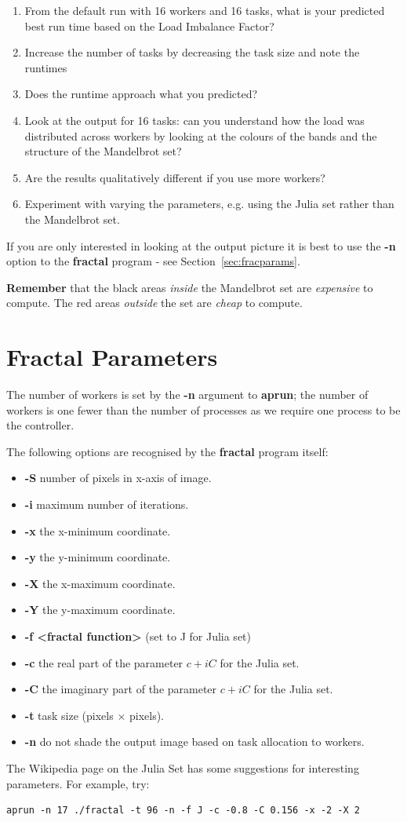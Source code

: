 \documentclass{article}
\begin{document}
\begin{enumerate}
\item From the default run with 16 workers and 16 tasks, what is your predicted best run time based on the Load Imbalance Factor?
\item Increase the number of tasks by decreasing the task size and note the runtimes
\item Does the runtime approach what you predicted?
\item Look at the output for 16 tasks: can you understand how the load was distributed across workers by looking at the colours of the bands and the structure of the Mandelbrot set?
\item Are the results qualitatively different if you use more workers?
\item Experiment with varying the parameters, e.g. using the Julia set rather than the Mandelbrot set.
\end{enumerate}

If you are only interested in looking at the output picture it is best
to use the \textbf{-n} option to the \textbf{fractal} program - see
Section~\ref{sec:fracparams}.

\textbf{Remember} that the black areas {\em inside} the Mandelbrot set are {\em
  expensive} to compute. The red areas {\em outside} the set are {\em cheap} to compute.

\section{\label{sec:fracparams}Fractal Parameters}

The number of workers is set by the \textbf{-n} argument to
\textbf{aprun}; the number of workers is one fewer than the number of
processes as we require one process to be the controller.

The following options are recognised by the \textbf{fractal} program
itself:

\begin{itemize}
\item \textbf{-S} number of pixels in x-axis of image.
\item \textbf{-i} maximum number of iterations.
\item \textbf{-x} the x-minimum coordinate.
\item \textbf{-y} the y-minimum coordinate.
\item \textbf{-X} the x-maximum coordinate.
\item \textbf{-Y} the y-maximum coordinate.
\item \textbf{-f <fractal function>} (set to J for Julia set)
\item \textbf{-c} the real part of the parameter $c + i C$ for the Julia set.
\item \textbf{-C} the imaginary part of the parameter $c + i C$ for the Julia set.
\item \textbf{-t} task size (pixels $\times$ pixels).
\item \textbf{-n} do not shade the output image based on task allocation to workers.
\end{itemize}

The Wikipedia page on the Julia Set has some suggestions for interesting parameters.
For example, try:
\begin{verbatim}
aprun -n 17 ./fractal -t 96 -n -f J -c -0.8 -C 0.156 -x -2 -X 2
\end{verbatim}

\nocite{*}
{}

\end{document}
